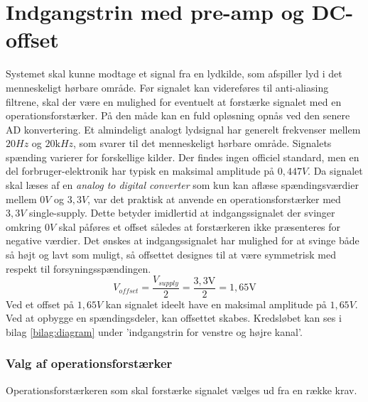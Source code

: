 \section{Indgangstrin med pre-amp og DC-offset}
\label{sec:inputstage}
Systemet skal kunne modtage et signal fra en lydkilde, som afspiller lyd i det menneskeligt hørbare område. 
Før signalet kan videreføres til anti-aliasing filtrene, skal der være en mulighed for eventuelt at forstærke signalet med en operationsforstærker. 
På den måde kan en fuld opløsning opnås ved den senere AD konvertering. 
\newline
Et almindeligt analogt lydsignal har generelt frekvenser mellem $20\si{Hz}$ og $20\si{\kilo Hz}$, som svarer til det menneskeligt hørbare område. 
Signalets spænding varierer for forskellige kilder. 
Der findes ingen officiel standard, men en del forbruger-elektronik har typisk en maksimal amplitude på $0,447\si{V}$.\cite{wikiLine} 
\newline
Da signalet skal læses af en \textit{analog to digital converter} som kun kan aflæse spændingsværdier mellem $0\si{V}$ og $3,3\si{V}$, var det praktisk at anvende en operationsforstærker med $3,3\si{V}$ single-supply.
Dette betyder imidlertid at indgangssignalet der svinger omkring $0\si{V}$ skal påføres et offset således at forstærkeren ikke præsenteres for negative værdier.  
Det ønskes at indgangssignalet har mulighed for at svinge både så højt og lavt som muligt, så offsettet designes til at være symmetrisk med respekt til  forsyningsspændingen. 
\begin{equation}
	{V_{offset}} = \frac{V_{supply}}{2} = \frac{3,3\text{V}}{2} = 1,65\text{V}
\end{equation}
Ved et offset på $1,65\si{V}$ kan signalet ideelt have en maksimal amplitude på $1,65\si{V}$. 
Ved at opbygge en spændingsdeler, kan offsettet skabes. 
Kredsløbet kan ses i bilag \ref{bilag:diagram} under 'indgangstrin for venstre og højre kanal'.

\subsubsection{Valg af operationsforstærker}
Operationsforstærkeren som skal forstærke signalet vælges ud fra en række krav. 

